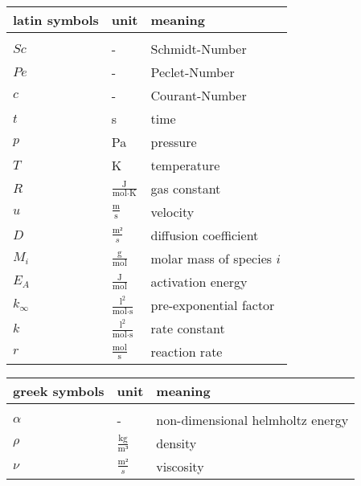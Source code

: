 \documentclass[../thesis.tex]{subfiles}
\begin{document}
	

\renewcommand*{\arraystretch}{1.2}
\small
\begin{tabular}{p{4cm}p{3cm}p{8cm}}
	\textbf{latin symbols} & \textbf{unit} & \textbf{meaning} \\ 
	\hline \\[\dimexpr-\normalbaselineskip+2pt]
	$Sc$ & - & Schmidt-Number \\
	$Pe$ & - & Peclet-Number \\
	$c$ & - & Courant-Number \\
	$t$ & s & time \\
	$p$ & Pa & pressure \\
	$T$ & K & temperature \\
	$R$ & $\frac{\text{J}}{\text{mol} \cdot \text{K}}$ & gas constant \\
	$u$ & $\frac{\text{m}}{\text{s}}$ & velocity \\
	$D$ & $\frac{\text{m²}}{s}$ & diffusion coefficient\\
	$M_i$ & $\frac{\text{g}}{\text{mol}}$ & molar mass of species $i$\\
	$E_A$ & $\frac{\text{J}}{\text{mol}}$ & activation energy \\
	$k_{\infty}$ & $\frac{\text{l}^2}{\text{mol} \cdot \text{s}}$ & pre-exponential factor \\
	$k$ & $\frac{\text{l}^2}{\text{mol} \cdot \text{s}}$ & rate constant \\
	$r$ & $\frac{\text{mol}}{\text{s}}$ & reaction rate \\
\end{tabular}
\vspace{1cm}

\small
\begin{tabular}{p{4cm}p{3cm}p{8cm}}
	\textbf{greek symbols} & \textbf{unit} & \textbf{meaning} \\ 
	\hline \\[\dimexpr-\normalbaselineskip+2pt] 
	$\alpha$ & - & non-dimensional helmholtz energy \\
	$\rho$ & $\frac{\text{kg}}{\text{m³}}$ & density \\
	$\nu$ & $\frac{\text{m²}}{s}$ & viscosity\\
\end{tabular}
\vspace{1cm}
\end{document}
